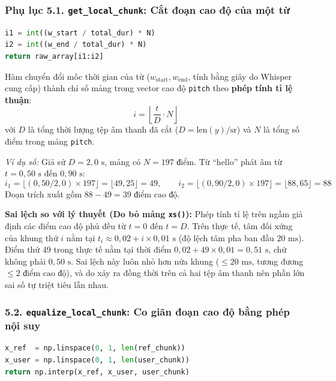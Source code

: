 \documentclass[11pt,a4paper]{article}
\begin{document}
\subsubsection*{Phụ lục 5.1. \texttt{get\_local\_chunk}: Cắt đoạn cao độ của một từ}
\begin{lstlisting}[language=Python]
i1 = int((w_start / total_dur) * N)
i2 = int((w_end / total_dur) * N)
return raw_array[i1:i2]
\end{lstlisting}

Hàm chuyển đổi mốc thời gian của từ ($w_{\text{start}}, w_{\text{end}}$, tính bằng giây do Whisper cung cấp) thành chỉ số mảng trong vector cao độ \texttt{pitch} theo \textbf{phép tính tỉ lệ thuận}:
\begin{equation}
i = \left\lfloor \frac{t}{D} \cdot N \right\rfloor
\end{equation}
với $D$ là tổng thời lượng tệp âm thanh đã cắt ($D = \text{len}(y)/\text{sr}$) và $N$ là tổng số điểm trong mảng \texttt{pitch}.

\textit{Ví dụ số:} Giả sử $D = 2{,}0\text{ s}$, mảng có $N = 197\text{ điểm}$. Từ ``hello'' phát âm từ $t = 0{,}50\text{ s}$ đến $0{,}90\text{ s}$:
\[
i_1 = \lfloor (0{,}50 / 2{,}0) \times 197 \rfloor = \lfloor 49{,}25 \rfloor = 49, \qquad i_2 = \lfloor (0{,}90 / 2{,}0) \times 197 \rfloor = \lfloor 88{,}65 \rfloor = 88
\]
Đoạn trích xuất gồm $88 - 49 = 39\text{ điểm cao độ}$.

\textbf{Sai lệch so với lý thuyết (Do bỏ mảng \texttt{xs()}):} Phép tính tỉ lệ trên ngầm giả định các điểm cao độ phủ đều từ $t = 0$ đến $t = D$. Trên thực tế, tâm đối xứng của khung thứ $i$ nằm tại $t_i \approx 0{,}02 + i \times 0{,}01\text{ s}$ (độ lệch tâm pha ban đầu $20\text{ ms}$). Điểm thứ 49 trong thực tế nằm tại thời điểm $0{,}02 + 49 \times 0{,}01 = 0{,}51\text{ s}$, chứ không phải $0{,}50\text{ s}$. Sai lệch này luôn nhỏ hơn nửa khung ($\le 20\text{ ms}$, tương đương $\le 2\text{ điểm cao độ}$), và do xảy ra đồng thời trên cả hai tệp âm thanh nên phần lớn sai số tự triệt tiêu lẫn nhau.

\subsubsection*{5.2. \texttt{equalize\_local\_chunk}: Co giãn đoạn cao độ bằng phép nội suy}
\begin{lstlisting}[language=Python]
x_ref  = np.linspace(0, 1, len(ref_chunk))
x_user = np.linspace(0, 1, len(user_chunk))
return np.interp(x_ref, x_user, user_chunk)
\end{lstlisting}
\end{document}

